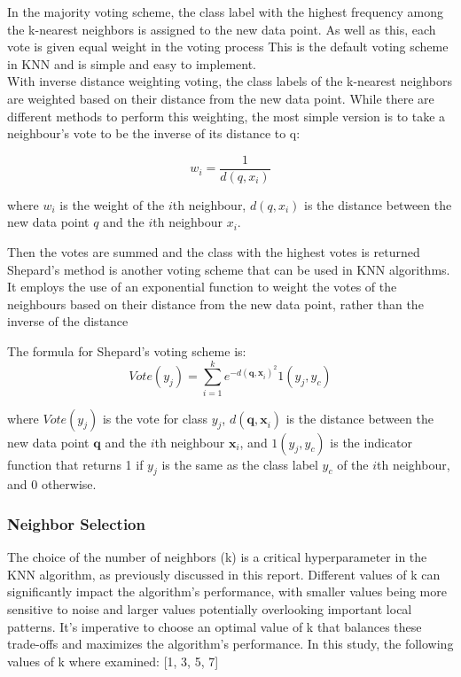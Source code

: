 In the majority voting scheme, the class label with the highest frequency among the k-nearest neighbors is assigned to the new data point.
As well as this, each vote is given equal weight in the voting process\cite{uccNotes}
This is the default voting scheme in KNN and is simple and easy to implement.\\

With inverse distance weighting voting, the class labels of the k-nearest neighbors are weighted based on their distance from the new data point.
While there are different methods to perform this weighting, the most simple version is to take a neighbour's vote to be the inverse
of its distance to q:

\[ w_i = \frac{1}{d(q, x_i)} \]

where \(w_i\) is the weight of the \(i\)th neighbour, \(d(q, x_i)\) is the distance between the new data point \(q\) and the \(i\)th neighbour \(x_i\).

Then the votes are summed and the class with the highest votes is returned\cite{uccNotes}\\

Shepard's method is another voting scheme that can be used in KNN algorithms. 
It employs the use of an exponential function to weight the votes of the neighbours based on their distance from the new data point,
rather than the inverse of the distance\cite{Cunningham2021}

The formula for Shepard's voting scheme is:
\begin{equation} 
    Vote(y_j)=\sum_{i=1}^k e^{-d(\mathbf{q,x}_i)^2}1(y_j,y_c)
\end{equation}

where \(Vote(y_j)\) is the vote for class \(y_j\), \(d(\mathbf{q,x}_i)\) is the
distance between the new data point \(\mathbf{q}\) and the \(i\)th neighbour \(\mathbf{x}_i\),
and \(1(y_j,y_c)\) is the indicator function that returns 1 if \(y_j\) is the same as
the class label \(y_c\) of the \(i\)th neighbour, and 0 otherwise.\\

\subsubsection*{Neighbor Selection}
The choice of the number of neighbors (k) is a critical hyperparameter in the KNN algorithm, as previously discussed in this report.
Different values of k can significantly impact the algorithm's performance,
with smaller values being more sensitive to noise and larger values potentially overlooking important local patterns.
It's imperative to choose an optimal value of k that balances these trade-offs and maximizes the algorithm's performance.
In this study, the following values of k where examined: [1, 3, 5, 7] \\


